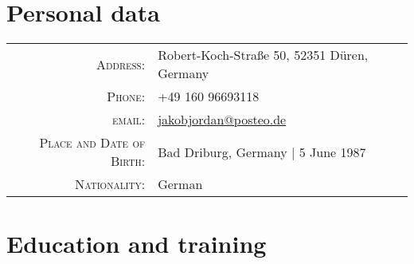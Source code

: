 \documentclass[a4paper,10pt]{article}
\begin{document}
\pagestyle{empty}

\par{\bigskip\par}

\section{Personal data}

\begin{tabular}{rl}
\textsc{Address:} & Robert-Koch-Stra\ss e 50, 52351 D\"uren, Germany \\
\textsc{Phone:} & +49 160 96693118\\
\textsc{email:} & \href{mailto:jakobjordan@posteo.de}{jakobjordan@posteo.de} \\
\textsc{Place and Date of Birth:} & Bad Driburg, Germany | 5 June 1987 \\
\textsc{Nationality:} & German
\end{tabular}

\section{Education and training}
\end{document}
